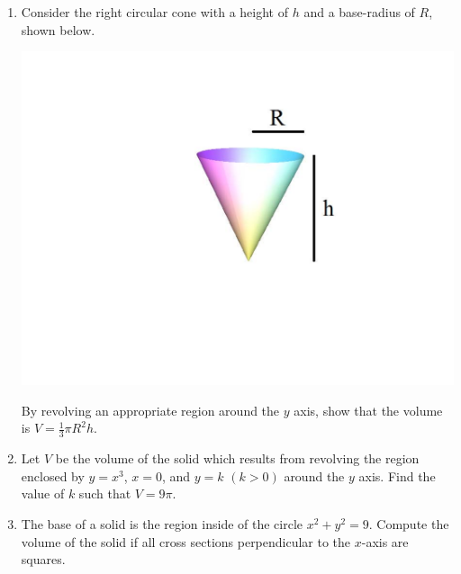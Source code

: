 \documentclass[12pt]{article}
\newif\ifans
\begin{document}
\begin{enumerate}
\item Consider the right circular cone with a height of $h$ and a base-radius of $R$, shown below.
\begin{center}
\includegraphics[scale=0.30]{cone.pdf}
\end{center}
By revolving an appropriate region around the $y$ axis, show that the volume is $V=\frac{1}{3}\pi R^2h$.

\ifans{\fbox{\parbox{1\linewidth}{We revolve the region enclosed by the line $y=\frac{h}{R}x$, $y=h$ and $x=0$ around the $y$-axis.
\begin{align*}
V&=\pi\int_0^h \left(\frac{R}{h}y\right)^2 \,dy\\
&=\pi\int_0^h \frac{R^2}{h^2}y^2 \,dy\\
&=\left.\frac{R^2\pi}{3h^2}y^3\right|_{y=0}^{y=h}\\
&=\frac{R^2\pi}{3h^2}h^3\\
&=\frac{1}{3}\pi R^2h
\end{align*}
}}} \fi

\item Let $V$ be the volume of the solid which results from revolving the region enclosed by $y=x^3$, $x=0$, and $y=k$ $(k>0)$ around the $y$ axis.  Find the value of $k$ such that $V=9\pi$.

\ifans{\fbox{$k=15^{3/5}$}} \fi

\item The base of a solid is the region inside of the circle $x^2+y^2=9$.  Compute the volume of the solid if all cross sections perpendicular to the $x$-axis are squares.


\end{enumerate}
\end{document}
